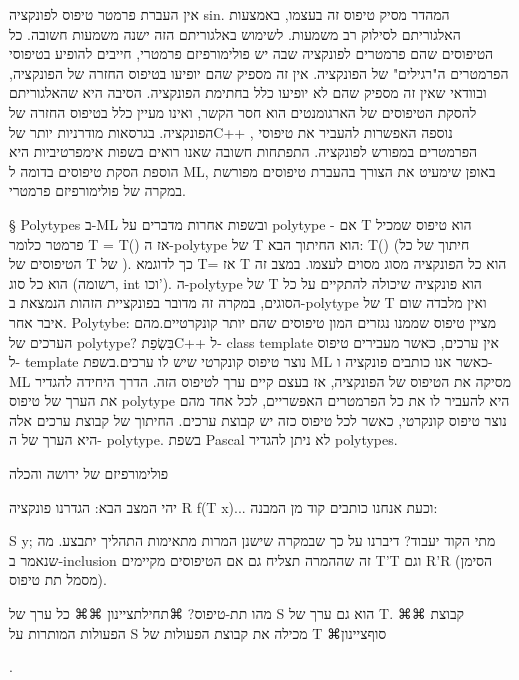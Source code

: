 אין העברת פרמטר טיפוס לפונקציה sin. המהדר מסיק טיפוס זה בעצמו, באמצעות
האלגוריתם לסילוק רב משמעות. לשימוש באלגוריתם הזה ישנה משמעות חשובה. כל הטיפוסים
שהם פרמטרים לפונקציה שבה יש פולימורפיזם פרמטרי, חייבים להופיע בטיפוסי הפרמטרים
ה"רגילים" של הפונקציה. אין זה מספיק שהם יופיעו בטיפוס החזרה של הפונקציה,
ובוודאי שאין זה מספיק שהם לא יופיעו כלל בחתימת הפונקציה. הסיבה היא שהאלגוריתם
להסקת הטיפוסים של הארגומנטים הוא חסר הקשר, ואינו מעיין כלל בטיפוס החזרה של
הפונקציה.  בגרסאות מודרניות יותר שלC++ , נוספה האפשרות להעביר את טיפוסי
הפרמטרים במפורש לפונקציה.  התפתחות חשובה שאנו רואים בשפות אימפרטיביות היא הוספת
הסקת טיפוסים בדומה ל ML, באופן שימעיט את הצורך בהעברת טיפוסים מפורשת במקרה של
פולימורפיזם פרמטרי.

§ Polytypes
ב-ML ובשפות אחרות מדברים על polytype - אם T הוא טיפוס שמכיל פרמטר כלומר T = T()
אז ה-polytype של T הוא החיתוך הבא: T() (חיתוך של כל הטיפוסים של T של ). כך
לדוגמא T= אז T הוא כל הפונקציה מסוג מסוים לעצמו. במצב זה הוא כל סוג (רשומה, int
וכו'). ה-polytype של T הוא פונקציה שיכולה להתקיים על כל הסוגים, במקרה זה מדובר
בפונקציית הזהות הנמצאת ב-polytype של T ואין מלבדה שום איבר אחר.  Polytybe:
מציין טיפוס שממנו נגזרים המון טיפוסים שהם יותר קונקרטיים.מהם הערכים של
polytype? בִּשְׂפַתC++ ל- class template אין ערכים, כאשר מעבירים טיפוס ל- template
נוצר טיפוס קונקרטי שיש לו ערכים.בשפת ML כאשר אנו כותבים פונקציה ו-ML מסיקה את
הטיפוס של הפונקציה, אז בעצם קיים ערך לטיפוס הזה.  הדרך היחידה להגדיר את הערך של
טיפוס polytype היא להעביר לו את כל הפרמטרים האפשריים, לכל אחד מהם נוצר טיפוס
קונקרטי, כאשר לכל טיפוס כזה יש קבוצת ערכים. החיתוך של קבוצת ערכים אלה היא הערך
של ה- polytype.  בשפת Pascal לא ניתן להגדיר polytypes.

        פולימורפיזם של ירושה והכלה

יהי המצב הבא: הגדרנו פונקציה R f(T x){...} וכעת אנחנו כותבים קוד מן המבנה:

        S y;
מתי הקוד יעבוד? דיברנו על כך שבמקרה שישנן המרות מתאימות התהליך יתבצע. מה שנאמר ב-inclusion זה שההמרה תצליח גם אם הטיפוסים מקיימים T'T וגם R'R (הסימן מסמל תת טיפוס).

מהו תת-טיפוס?
        ⌘תחילת{ציינון}
        ⌘⌘ כל ערך של S הוא גם ערך של T.
        ⌘⌘ קבוצת הפעולות המותרות על S מכילה את קבוצת הפעולות של T
      ⌘סוף{ציינון}

        .

